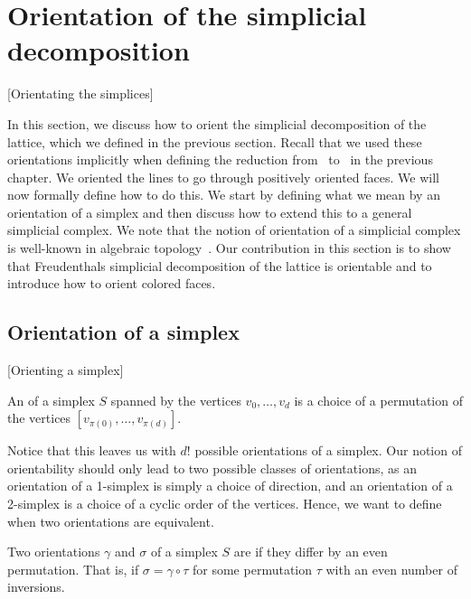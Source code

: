 \section{Orientation of the simplicial decomposition}[Orientating the simplices]

In this section, we discuss how to orient the simplicial decomposition of the lattice, which we defined in the previous section. Recall that we used these orientations implicitly when defining the reduction from \Sperner\ to \EndOfLine\ in the previous chapter. We oriented the lines to go through positively oriented faces. We will now formally define how to do this. We start by defining what we mean by an orientation of a simplex and then discuss how to extend this to a general simplicial complex. We note that the notion of orientation of a simplicial complex is well-known in algebraic topology~. Our contribution in this section is to show that Freudenthals simplicial decomposition of the lattice is orientable and to introduce how to orient colored faces.

\subsection{Orientation of a simplex}[Orienting a simplex]\label{sec:orientation_of_simplex}

\begin{definition}
	An  of a simplex $S$ spanned by the vertices $v_0, \dots, v_d$ is a choice of a permutation of the vertices $[v_{\pi(0)}, \dots, v_{\pi(d)}]$.
\end{definition}

Notice that this leaves us with ${d!}$ possible orientations of a simplex. Our notion of orientability should only lead to two possible classes of orientations, as an orientation of a 1-simplex is simply a choice of direction, and an orientation of a 2-simplex is a choice of a cyclic order of the vertices. Hence, we want to define when two orientations are equivalent.

\begin{definition}
	Two orientations $\gamma$ and $\sigma$ of a simplex $S$ are  if they differ by an even permutation. That is, if $\sigma = \gamma \circ \tau$ for some permutation $\tau$ with an even number of inversions.
\end{definition}

